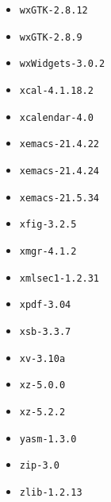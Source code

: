 \begin{multicols}{3}
\begin{itemize}
\item \verb|wxGTK-2.8.12|
\item \verb|wxGTK-2.8.9|
\item \verb|wxWidgets-3.0.2|
\item \verb|xcal-4.1.18.2|
\item \verb|xcalendar-4.0|
\item \verb|xemacs-21.4.22|
\item \verb|xemacs-21.4.24|
\item \verb|xemacs-21.5.34|
\item \verb|xfig-3.2.5|
\item \verb|xmgr-4.1.2|
\item \verb|xmlsec1-1.2.31|
\item \verb|xpdf-3.04|
\item \verb|xsb-3.3.7|
\item \verb|xv-3.10a|
\item \verb|xz-5.0.0|
\item \verb|xz-5.2.2|
\item \verb|yasm-1.3.0|
\item \verb|zip-3.0|
\item \verb|zlib-1.2.13|
\end{itemize}
\end{multicols}
\normalsize
